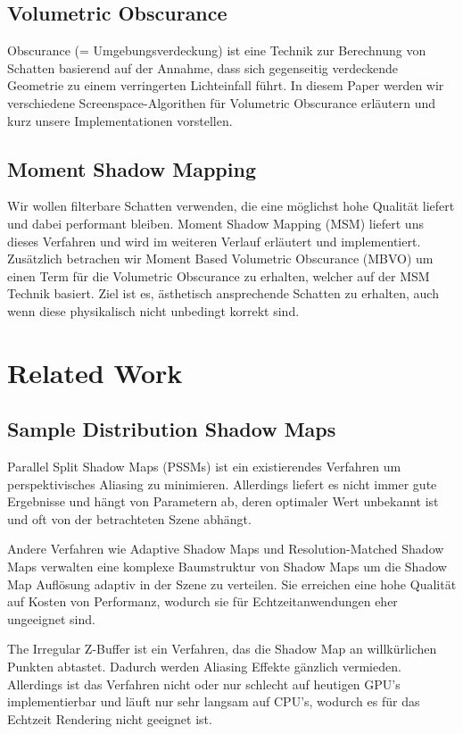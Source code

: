 \documentclass[runningheaders,a4paper]{llncs}
\begin{document}
\subsection{Volumetric Obscurance}
Obscurance (= Umgebungsverdeckung) ist eine Technik zur Berechnung von Schatten basierend auf der Annahme,
dass sich gegenseitig verdeckende Geometrie zu einem verringerten Lichteinfall führt.
In diesem Paper werden wir verschiedene Screenspace-Algorithen für Volumetric Obscurance erläutern und kurz unsere Implementationen vorstellen.


\subsection{Moment Shadow Mapping}
Wir wollen filterbare Schatten verwenden, die eine möglichst hohe Qualität liefert und dabei performant bleiben.
Moment Shadow Mapping (MSM) liefert uns dieses Verfahren und wird im weiteren Verlauf erläutert und implementiert.
Zusätzlich betrachen wir Moment Based Volumetric Obscurance (MBVO) um einen Term für die Volumetric Obscurance zu erhalten, welcher auf der MSM Technik basiert.
Ziel ist es, ästhetisch ansprechende Schatten zu erhalten, auch wenn diese physikalisch nicht unbedingt korrekt sind.

\section{Related Work}

\subsection{Sample Distribution Shadow Maps}

Parallel Split Shadow Maps (PSSMs) \cite{pssm} ist ein existierendes Verfahren um perspektivisches Aliasing zu minimieren.
Allerdings liefert es nicht immer gute Ergebnisse und hängt von Parametern ab, deren optimaler Wert unbekannt ist und oft von der betrachteten Szene abhängt.

Andere Verfahren wie Adaptive Shadow Maps \cite{asm} und Resolution-Matched Shadow Maps \cite{rmsm} verwalten eine komplexe Baumstruktur von Shadow Maps um die Shadow Map Auflösung adaptiv in der Szene zu verteilen.
Sie erreichen eine hohe Qualität auf Kosten von Performanz, wodurch sie für Echtzeitanwendungen eher ungeeignet sind.

The Irregular Z-Buffer \cite{irregular} ist ein Verfahren, das die Shadow Map an willkürlichen Punkten abtastet.
Dadurch werden Aliasing Effekte gänzlich vermieden.
Allerdings ist das Verfahren nicht oder nur schlecht auf heutigen GPU's implementierbar und läuft nur sehr langsam auf CPU's, wodurch es für das Echtzeit Rendering nicht geeignet ist.
\end{document}
